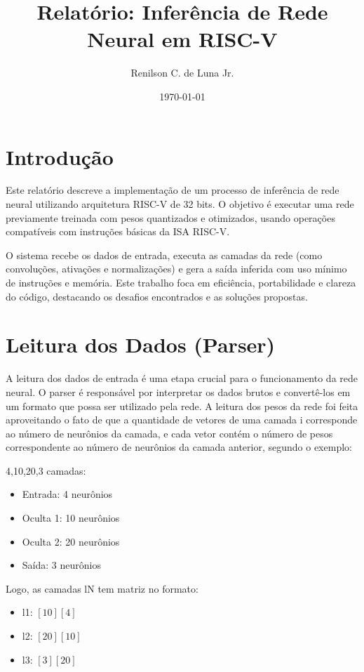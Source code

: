 \documentclass[12pt]{article}
\title{Relatório: Inferência de Rede Neural em RISC-V}
\author{Renilson C. de Luna Jr.}
\date{\today}
\begin{document}
\maketitle

\section{Introdução}

\noindent
\hspace{2em}Este relatório descreve a implementação de um processo de inferência de rede neural utilizando arquitetura RISC-V de 32 bits. O objetivo é executar uma rede previamente treinada com pesos quantizados e otimizados, usando operações compatíveis com instruções básicas da ISA RISC-V.

\hspace{2em}O sistema recebe os dados de entrada, executa as camadas da rede (como convoluções, ativações e normalizações) e gera a saída inferida com uso mínimo de instruções e memória. Este trabalho foca em eficiência, portabilidade e clareza do código, destacando os desafios encontrados e as soluções propostas.

\section{Leitura dos Dados (Parser)}

\noindent
\hspace{2em}A leitura dos dados de entrada é uma etapa crucial para o funcionamento da rede neural. O parser é responsável por interpretar os dados brutos e convertê-los em um formato que possa ser utilizado pela rede. A leitura dos pesos da rede foi feita aproveitando o fato de que a quantidade de vetores de uma camada i corresponde ao número de neurônios da camada, e cada vetor contém o número de pesos correspondente ao número de neurônios da camada anterior, segundo o exemplo:

4,10,20,3  camadas:
\begin{itemize}
    \item Entrada: 4 neurônios
    \item Oculta 1: 10 neurônios
    \item Oculta 2: 20 neurônios
    \item Saída: 3 neurônios
\end{itemize}

Logo, as camadas lN tem matriz no formato:

\begin{itemize}
    \item l1: $[10][4]$
    \item l2: $[20][10]$
    \item l3: $[3][20]$
\end{itemize}
\end{document}
